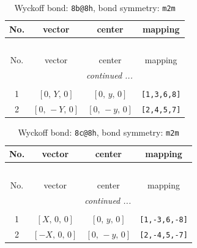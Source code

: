 \documentclass[fleqn,8pt]{jsarticle}
\begin{document}
\renewcommand{\arraystretch}{1.2}
\begin{longtable}{cccc}
\caption{Wyckoff bond: {\tt 8b@8h}, bond symmetry: {\tt m2m}}
 \\
 \hline \hline
No. & vector & center & mapping \\ \hline \endfirsthead

\multicolumn{3}{l}{\tablename\ \thetable{}} \\
 \hline \hline
No. & vector & center & mapping \\ \hline \endhead

 \hline \hline
\multicolumn{3}{r}{\footnotesize\it continued ...} \\ \endfoot

 \hline \hline
\multicolumn{3}{r}{} \\ \endlastfoot

1 & $\left[ 0,\, Y,\, 0 \right]$ & $\left[ 0,\, y,\, 0 \right]$ & {\tt [1,3,6,8]} \\ \hline
2 & $\left[ 0,\, - Y,\, 0 \right]$ & $\left[ 0,\, - y,\, 0 \right]$ & {\tt [2,4,5,7]} \\
\end{longtable}
\renewcommand{\arraystretch}{1.2}
\begin{longtable}{cccc}
\caption{Wyckoff bond: {\tt 8c@8h}, bond symmetry: {\tt m2m}}
 \\
 \hline \hline
No. & vector & center & mapping \\ \hline \endfirsthead

\multicolumn{3}{l}{\tablename\ \thetable{}} \\
 \hline \hline
No. & vector & center & mapping \\ \hline \endhead

 \hline \hline
\multicolumn{3}{r}{\footnotesize\it continued ...} \\ \endfoot

 \hline \hline
\multicolumn{3}{r}{} \\ \endlastfoot

1 & $\left[ X,\, 0,\, 0 \right]$ & $\left[ 0,\, y,\, 0 \right]$ & {\tt [1,-3,6,-8]} \\ \hline
2 & $\left[ - X,\, 0,\, 0 \right]$ & $\left[ 0,\, - y,\, 0 \right]$ & {\tt [2,-4,5,-7]} \\
\end{longtable}
\renewcommand{\arraystretch}{1.2}
\end{document}
